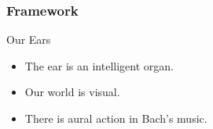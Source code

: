 	\begin{frame}
		\frametitle{Framework}
		\begin{block}{Our Ears}
			\begin{itemize}
				\item The ear is an intelligent organ.
				\item Our world is visual.
				\item There is aural action in Bach's music.
			\end{itemize}
			
		\end{block}
	\end{frame}
